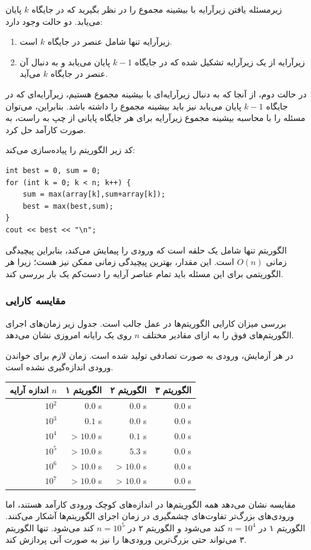 زیرمسئله یافتن زیرآرایه با بیشینه مجموع را در نظر بگیرید که در جایگاه $k$ پایان می‌یابد. دو حالت وجود دارد:
\begin{enumerate}
\item زیرآرایه تنها شامل عنصر در جایگاه $k$ است.
\item زیرآرایه از یک زیرآرایه تشکیل شده که در جایگاه $k-1$ پایان می‌یابد و به دنبال آن عنصر در جایگاه $k$ می‌آید.
\end{enumerate}

در حالت دوم، از آنجا که به دنبال زیرآرایه‌ای با بیشینه مجموع هستیم، زیرآرایه‌ای که در جایگاه $k-1$ پایان می‌یابد نیز باید بیشینه مجموع را داشته باشد. بنابراین، می‌توان مسئله را با محاسبه بیشینه مجموع زیرآرایه برای هر جایگاه پایانی از چپ به راست، به صورت کارآمد حل کرد.

کد زیر الگوریتم را پیاده‌سازی می‌کند:
\begin{lstlisting}
int best = 0, sum = 0;
for (int k = 0; k < n; k++) {
    sum = max(array[k],sum+array[k]);
    best = max(best,sum);
}
cout << best << "\n";
\end{lstlisting}

الگوریتم تنها شامل یک حلقه است که ورودی را پیمایش می‌کند، بنابراین پیچیدگی زمانی $O(n)$ است. این مقدار، بهترین پیچیدگی زمانی ممکن نیز هست؛ زیرا هر الگوریتمی برای این مسئله باید تمام عناصر آرایه را دست‌کم یک بار بررسی کند.

\subsubsection{مقایسه کارایی}

بررسی میزان کارایی الگوریتم‌ها در عمل جالب است. جدول زیر زمان‌های اجرای الگوریتم‌های فوق را به ازای مقادیر مختلف $n$ روی یک رایانه امروزی نشان می‌دهد.

در هر آزمایش، ورودی به صورت تصادفی تولید شده است. زمان لازم برای خواندن ورودی اندازه‌گیری نشده است.

\begin{center}
\begin{tabular}{rrrr}
اندازه آرایه $n$ & الگوریتم ۱ & الگوریتم ۲ & الگوریتم ۳ \\
\hline
$10^2$ & $0.0$ s & $0.0$ s & $0.0$ s \\
$10^3$ & $0.1$ s & $0.0$ s & $0.0$ s \\
$10^4$ & > $10.0$ s & $0.1$ s & $0.0$ s \\
$10^5$ & > $10.0$ s & $5.3$ s & $0.0$ s \\
$10^6$ & > $10.0$ s & > $10.0$ s & $0.0$ s \\
$10^7$ & > $10.0$ s & > $10.0$ s & $0.0$ s \\
\end{tabular}
\end{center}

مقایسه نشان می‌دهد همه الگوریتم‌ها در اندازه‌های کوچک ورودی کارآمد هستند، اما ورودی‌های بزرگ‌تر تفاوت‌های چشمگیری در زمان اجرای الگوریتم‌ها آشکار می‌کنند.
الگوریتم ۱ در $n=10^4$ کند می‌شود و الگوریتم ۲ در $n=10^5$ کند می‌شود.
تنها الگوریتم ۳ می‌تواند حتی بزرگ‌ترین ورودی‌ها را نیز به صورت آنی پردازش کند.